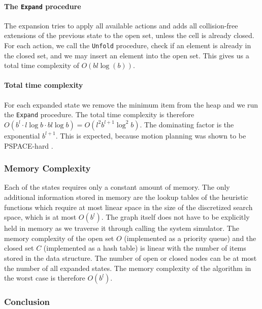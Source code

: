 \paragraph{The \texttt{Expand} procedure}
The expansion tries to apply all available actions and adds all collision-free extensions of the previous state to the open set, unless the cell is already closed. For each action, we call the \texttt{Unfold} procedure, check if an element is already in the closed set, and we may insert an element into the open set. This gives us a total time complexity of $O(bl \log(b))$.

\paragraph{Total time complexity} For each expanded state we remove the minimum item from the heap and we run the \texttt{Expand} procedure. The total time complexity is therefore $O(b^l \cdot l\log b \cdot bl \log b)=O(l^{2}b^{l+1}\log^2 b)$. The dominating factor is the exponential $b^{l+1}$. This is expected, because motion planning was shown to be PSPACE-hard \cite[Chapter~6.5.1]{lavalle_2006}.

\subsubsection{Memory Complexity}

Each of the states requires only a constant amount of memory. The only additional information stored in memory are the lookup tables of the heuristic functions which require at most linear space in the size of the discretized search space, which is at most $O(b^l)$. The graph itself does not have to be explicitly held in memory as we traverse it through calling the system simulator. The memory complexity of the open set $O$ (implemented as a priority queue) and the closed set $C$ (implemented as a hash table) is linear with the number of items stored in the data structure. The number of open or closed nodes can be at most the number of all expanded states. The memory complexity of the algorithm in the worst case is therefore $O(b^l)$.

\subsubsection{Conclusion}

